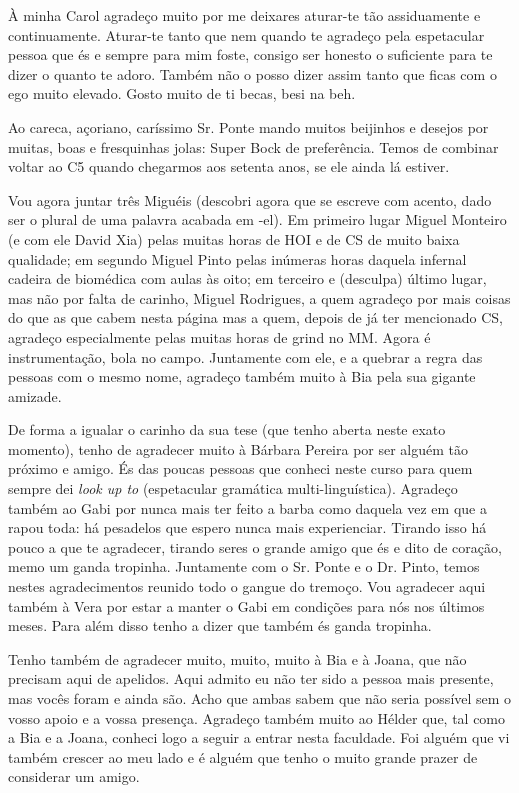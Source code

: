 À minha Carol agradeço muito por me deixares aturar-te tão assiduamente e continuamente. Aturar-te tanto 
que nem quando te agradeço pela espetacular pessoa que és e sempre para mim foste, consigo ser 
honesto o suficiente para te dizer o quanto te adoro. Também não o posso dizer assim tanto que 
ficas com o ego muito elevado. Gosto muito de ti becas, besi na beh.

Ao careca, açoriano, caríssimo Sr. Ponte mando muitos beijinhos e desejos por muitas, boas e fresquinhas 
jolas: Super Bock de preferência. Temos de combinar voltar ao C5 quando chegarmos aos setenta anos, 
se ele ainda lá estiver.

Vou agora juntar três Miguéis (descobri agora que se escreve com acento, dado ser o plural de uma palavra
acabada em -el). Em primeiro lugar Miguel Monteiro (e com ele David Xia) pelas muitas horas de HOI e de CS 
de muito baixa qualidade; em segundo Miguel Pinto pelas inúmeras horas daquela infernal cadeira de biomédica 
com aulas às oito; em terceiro e (desculpa) último lugar, mas não por falta de carinho, Miguel Rodrigues, a quem agradeço por mais coisas do que as que cabem nesta página mas a quem, depois de já ter mencionado CS, 
agradeço especialmente pelas muitas horas de grind no MM. Agora é instrumentação, bola no campo. 
Juntamente com ele, e a quebrar a regra das pessoas 
com o mesmo nome, agradeço também muito à Bia pela sua gigante amizade.

De forma a igualar o carinho da sua tese (que tenho aberta neste exato momento), tenho de agradecer muito 
à Bárbara Pereira por ser alguém tão próximo e amigo. És das poucas pessoas que conheci neste curso para quem 
sempre dei \textit{look up to} (espetacular gramática multi-linguística). Agradeço também ao Gabi por nunca 
mais ter feito a barba como daquela vez em que a rapou toda: há pesadelos que espero nunca mais experienciar. 
Tirando isso há pouco a que te agradecer, tirando seres o grande amigo que és e dito de coração, memo um ganda 
tropinha. Juntamente com o Sr. Ponte e o Dr. Pinto, temos nestes agradecimentos reunido todo o gangue do tremoço. 
Vou agradecer aqui também à Vera por estar a manter o Gabi em condições para nós nos últimos meses. 
Para além disso tenho a dizer que também és ganda tropinha. 

Tenho também de agradecer muito, muito, muito à Bia e à Joana, que não precisam aqui de apelidos. Aqui admito 
eu não ter sido a pessoa mais presente, mas vocês foram e ainda são. Acho que ambas sabem que não seria possível 
sem o vosso apoio e a vossa presença. Agradeço também muito ao Hélder que, tal como a Bia e a Joana, conheci logo a seguir a entrar nesta faculdade. Foi alguém que vi também crescer ao meu lado e é alguém que tenho 
o muito grande prazer de considerar um amigo.

